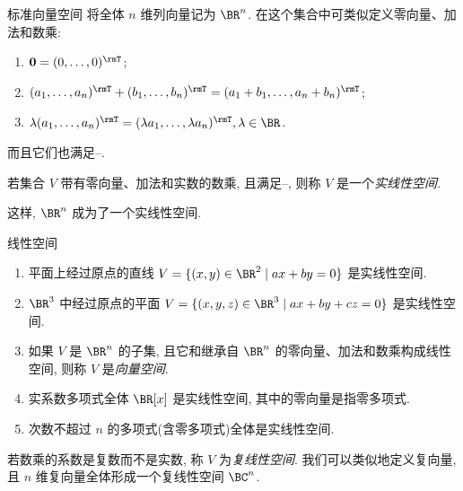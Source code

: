 \begin{frame}{标准向量空间\noexer}
	\onslide<+->
	将全体 $n$ 维列向量记为 $\BR^n$.
	\onslide<+->
	在这个集合中可类似定义零向量、加法和数乘:
	\begin{enumerate}
		\item ${\bf0}=(0,\dots,0)^\rmT$;
		\item $(a_1,\dots,a_n)^\rmT+(b_1,\dots,b_n)^\rmT=(a_1+b_1,\dots,a_n+b_n)^\rmT$;
		\item $\lambda(a_1,\dots,a_n)^\rmT=(\lambda a_1,\dots,\lambda a_n)^\rmT,\lambda\in\BR$.
	\end{enumerate}
	\onslide<+->
	而且它们也满足--.
	\onslide<+->
	\begin{definition}
		若集合 $V$ 带有零向量、加法和实数的数乘, 且满足--, 则称 $V$ 是一个\emph{实线性空间}.
	\end{definition}
	\onslide<+->
	这样, $\BR^n$ 成为了一个实线性空间.
\end{frame}


\begin{frame}{线性空间\noexer}
	\onslide<+->
	\begin{example}
		\begin{enumerate}
			\item 平面上经过原点的直线 $V=\{(x,y)\in\BR^2\mid ax+by=0\}$ 是实线性空间.
			\item $\BR^3$ 中经过原点的平面 $V=\{(x,y,z)\in\BR^3\mid ax+by+cz=0\}$ 是实线性空间.
			\item 如果 $V$ 是 $\BR^n$ 的子集, 且它和继承自 $\BR^n$ 的零向量、加法和数乘构成线性空间, 则称 $V$ 是\emph{向量空间}.
			\item 实系数多项式全体 $\BR[x]$ 是实线性空间, 其中的零向量是指零多项式.
			\item 次数不超过 $n$ 的多项式(含零多项式)全体是实线性空间.
		\end{enumerate}
	\end{example}
	\onslide<+->
	若数乘的系数是复数而不是实数, 称 $V$ 为\emph{复线性空间}.
	\onslide<+->
	我们可以类似地定义复向量, 且 $n$ 维复向量全体形成一个复线性空间 $\BC^n$.
\end{frame}


